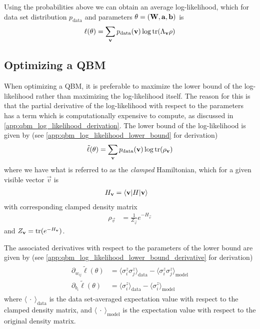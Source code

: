 Using the probabilities above we can obtain an average log-likelihood, which for data set distribution \( p_\text{data} \) and parameters \( \theta = (\mathbf{W}, \mathbf{a}, \mathbf{b}) \) is
\begin{align}
    \ell(\theta) = \sum_{\mathbf{v}} p_{\text{data}}(\mathbf{v}) \log \text{tr}(\Lambda_{\mathbf{v}}\rho)
\end{align}

\subsection{Optimizing a QBM}
When optimizing a QBM, it is preferable to maximize the lower bound of the log-likelihood rather than maximizing the log-likelihood itself.
The reason for this is that the partial derivative of the log-likelihood with respect to the parameters has a term which is computationally expensive to compute, as discussed in \cref{app:qbm_log_likelihood_derivation}.
The lower bound of the log-likelihood is given by (see \cref{app:qbm_log_likelihood_lower_bound} for derivation)
\begin{align}
    \tilde{\ell}(\theta) = \sum_{\mathbf{v}} p_{\text{data}}(\mathbf{v}) \log \text{tr}(\rho_{\mathbf{v}})
\end{align}
where we have what is referred to as the \textit{clamped} Hamiltonian, which for a given visible vector \( \vec{v} \) is
\begin{align}
    H_{\mathbf{v}}
        &= \braket{\mathbf{v}|H|\mathbf{v}}
\end{align}
with corresponding clamped density matrix
\begin{align}
    \rho_\vec{v}
        &= \frac{1}{Z_\vec{v}} e^{-H_\vec{v}}
\end{align}
and \( Z_{\mathbf{v}} = \text{tr}(e^{-H_{\mathbf{v}}}) \).

The associated derivatives with respect to the parameters of the lower bound are given by (see \cref{app:qbm_log_likelihood_lower_bound_derivative} for derivation)
\begin{align}
\begin{split}
    \partial_{w_{ij}} \tilde{\ell}(\theta)
        &= \langle \sigma_i^z \sigma_j^z \rangle_\text{data} - \langle \sigma_i^z \sigma_j^z \rangle_\text{model} \\
    \partial_{b_i} \tilde{\ell}(\theta)
        &= \langle \sigma_i^z \rangle_\text{data} - \langle \sigma_i^z \rangle_\text{model}
\end{split}
\end{align}
where \( \langle \ \cdot \ \rangle_\text{data} \) is the data set-averaged expectation value with respect to the clamped density matrix, and \( \langle \ \cdot \ \rangle_\text{model} \) is the expectation value with respect to the original density matrix.

